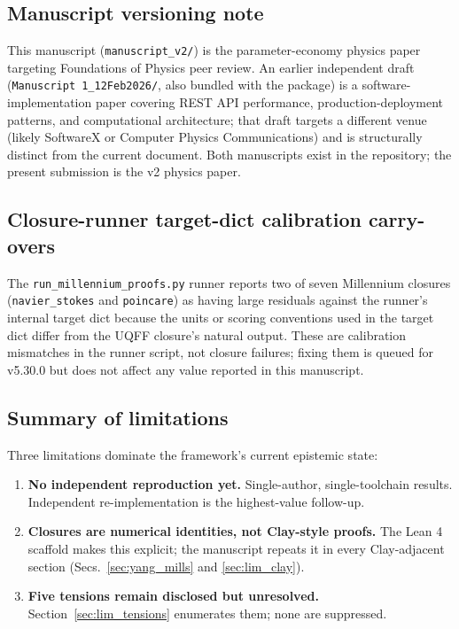 \subsection{Manuscript versioning note}
\label{sec:lim_manuscript}

This manuscript (\texttt{manuscript\_v2/}) is the
parameter-economy physics paper targeting Foundations of Physics
peer review. An earlier independent draft
(\texttt{Manuscript 1\_12Feb2026/}, also bundled with the package)
is a software-implementation paper covering REST API performance,
production-deployment patterns, and computational architecture;
that draft targets a different venue (likely SoftwareX or Computer
Physics Communications) and is structurally distinct from the
current document. Both manuscripts exist in the repository; the
present submission is the v2 physics paper.

\subsection{Closure-runner target-dict calibration carry-overs}
\label{sec:lim_runner_targets}

The \texttt{run\_millennium\_proofs.py} runner reports two of seven
Millennium closures (\texttt{navier\_stokes} and \texttt{poincare})
as having large residuals against the runner's internal target dict
because the units or scoring conventions used in the target dict
differ from the UQFF closure's natural output. These are
calibration mismatches in the runner script, not closure failures;
fixing them is queued for v5.30.0 but does not affect any value
reported in this manuscript.

\subsection{Summary of limitations}
\label{sec:lim_summary}

Three limitations dominate the framework's current epistemic state:

\begin{enumerate}
  \item \textbf{No independent reproduction yet.} Single-author,
        single-toolchain results. Independent re-implementation is
        the highest-value follow-up.
  \item \textbf{Closures are numerical identities, not Clay-style
        proofs.} The Lean 4 scaffold makes this explicit; the
        manuscript repeats it in every Clay-adjacent section
        (Secs.~\ref{sec:yang_mills} and \ref{sec:lim_clay}).
  \item \textbf{Five tensions remain disclosed but unresolved.}
        Section~\ref{sec:lim_tensions} enumerates them; none are
        suppressed.
\end{enumerate}

